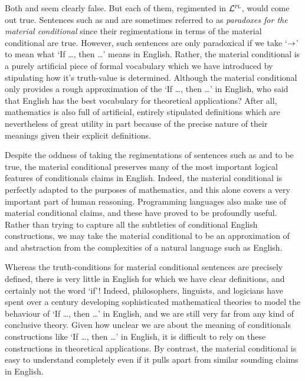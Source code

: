 Both  and  seem clearly false.
But each of them, regimented in $\mathcal{L}^{\textsc{pl}}$, would come out true.
Sentences such as  and  are sometimes referred to as \textit{paradoxes for the material conditional} since their regimentations in terms of the material conditional are true.
However, such sentences are only paradoxical if we take `$\rightarrow$' to mean what `If \ldots, then \ldots' means in English.
Rather, the material conditional is a purely artificial piece of formal vocabulary which we have introduced by stipulating how it's truth-value is determined.
Although the material conditional only provides a rough approximation of the `If \ldots, then \ldots' in English, who said that English has the best vocabulary for theoretical applications?
After all, mathematics is also full of artificial, entirely stipulated definitions which are nevertheless of great utility in part because of the precise nature of their meanings given their explicit definitions.

Despite the oddness of taking the regimentations of sentences such as  and  to be true, the material conditional preserves many of the most important logical features of conditionals claims in English.
Indeed, the material conditional is perfectly adapted to the purposes of mathematics, and this alone covers a very important part of human reasoning.
Programming languages also make use of material conditional claims, and these have proved to be profoundly useful.
Rather than trying to capture all the subtleties of conditional English constructions, we may take the material conditional to be an approximation of and abstraction from the complexities of a natural language such as English. 

Whereas the truth-conditions for material conditional sentences are precisely defined, there is very little in English for which we have clear definitions, and certainly not the word `if'!
Indeed, philosophers, linguists, and logicians have spent over a century developing sophisticated mathematical theories to model the behaviour of `If \ldots, then \ldots' in English, and we are still very far from any kind of conclusive theory.
Given how unclear we are about the meaning of conditionals constructions like `If \ldots, then \ldots' in English, it is difficult to rely on these constructions in theoretical applications.
By contrast, the material conditional is easy to understand completely even if it pulls apart from similar sounding claims in English.

